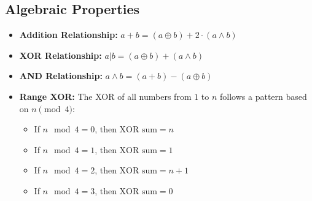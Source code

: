 \subsection{Algebraic Properties}

\begin{itemize}
    \item \textbf{Addition Relationship: } $a + b = (a \oplus b) + 2 \cdot (a \land b)$
    \item \textbf{XOR Relationship: }$a | b = (a \oplus b) + (a \land b)$
    \item \textbf{AND Relationship: }$a \land b = (a + b) - (a \oplus b)$
    \item \textbf{Range XOR: } The XOR of all numbers from $1$ to $n$ follows a pattern based on $n \pmod 4$:
          \begin{itemize}
              \item If $n \mod 4 = 0$, then $\text{XOR sum} = n$
              \item If $n \mod 4 = 1$, then $\text{XOR sum} = 1$
              \item If $n \mod 4 = 2$, then $\text{XOR sum} = n + 1$
              \item If $n \mod 4 = 3$, then $\text{XOR sum} = 0$
          \end{itemize}
\end{itemize}